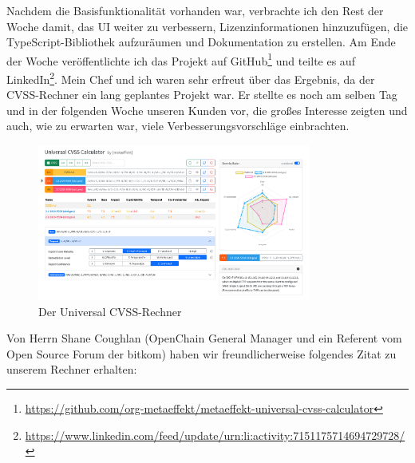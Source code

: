 Nachdem die Basisfunktionalität vorhanden war, verbrachte ich den Rest der Woche damit, das UI weiter zu verbessern, Lizenzinformationen hinzuzufügen, die TypeScript-Bibliothek aufzuräumen und Dokumentation zu erstellen.
Am Ende der Woche veröffentlichte ich das Projekt auf GitHub\footnote{\url{https://github.com/org-metaeffekt/metaeffekt-universal-cvss-calculator}} und teilte es auf LinkedIn\footnote{\url{https://www.linkedin.com/feed/update/urn:li:activity:7151175714694729728/}}.
Mein Chef und ich waren sehr erfreut über das Ergebnis, da der CVSS-Rechner ein lang geplantes Projekt war.
Er stellte es noch am selben Tag und in der folgenden Woche unseren Kunden vor, die großes Interesse zeigten und auch, wie zu erwarten war, viele Verbesserungsvorschläge einbrachten.

\begin{figure}[htbp] %
    \centering
    \includegraphics[width=0.8\textwidth, keepaspectratio]{res/img/metaeffekt-cvss-calculator-ui}
    \caption{Der \metaeffekt Universal CVSS-Rechner}
    \label{fig:metaeffekt-cvss-calculator-ui}
\end{figure}

Von Herrn Shane Coughlan (OpenChain General Manager und ein Referent vom Open Source Forum der bitkom) haben wir freundlicherweise folgendes Zitat zu unserem Rechner erhalten:
\begin{quote}
    \textit{}
\end{quote}
